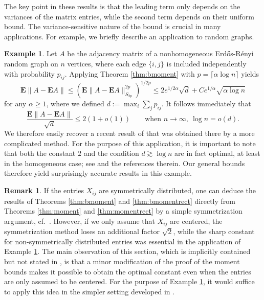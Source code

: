 \documentclass[10pt,reqno]{amsart}
\theoremstyle{definition}
\newtheorem{example}[thm]{Example}
\newtheorem{rem}[thm]{Remark}
\numberwithin{equation}{section}
\numberwithin{figure}{section}
\numberwithin{table}{section}
\begin{document}
The key point in these results is that the leading term only depends on 
the variances of the matrix entries, while the second term depends on 
their uniform bound. The variance-sensitive nature of the bound is crucial 
in many applications. For example, we briefly describe an application to 
random graphs.

\begin{example}
\label{ex:erdos}
Let $A$ be the adjacency matrix of a nonhomogeneous Erd\H{o}s-R\'enyi 
random graph on $n$ vertices, where each edge $\{i,j\}$ is included 
independently with probability $p_{ij}$. Applying Theorem 
\ref{thm:bmoment} with $p=\lceil \alpha\log n\rceil$ yields
$$
	\mathbf{E}\|A-\mathbf{E}A\| \le
	(\mathbf{E}\|A-\mathbf{E}A\|_{S_{2p}}^{2p})^{1/2p} 
	\le
	2e^{1/2\alpha}\sqrt{d}+Ce^{1/\alpha}\sqrt{\alpha\log n}
$$
for any $\alpha\ge 1$, where we defined
$d:=\max_i\sum_j p_{ij}$. It follows immediately that
$$
	\frac{\mathbf{E}\|A-\mathbf{E}A\|}{\sqrt{d}} \le
	2(1+o(1))
	\qquad\mbox{when }n\to\infty,~\log n=o(d).
$$
We therefore easily recover a recent result of \cite{BBK17} that was 
obtained there by a more complicated method. For the purpose of this 
application, it is important to note that both the constant $2$ and the 
condition $d\gtrsim\log n$ are in fact optimal, at least in the 
homogeneous case; see \cite{BBK17} and the references therein. Our general 
bounds therefore yield surprisingly accurate results in this example.
\end{example}

\begin{rem}
If the entries $X_{ij}$ are symmetrically distributed, one can deduce the 
results of Theorems \ref{thm:bmoment} and \ref{thm:bmomentrect} directly 
from Theorems \ref{thm:moment} and \ref{thm:momentrect} by a simple 
symmetrization argument, cf.\ \cite[Corollary 
3.6]{BvH16}. However, if we only assume that $X_{ij}$ are centered, the
symmetrization method loses an additional factor $\sqrt{2}$, while the 
sharp constant for non-symmetrically distributed entries was essential
in the application of Example \ref{ex:erdos}. The main 
observation of this section, which is implicitly contained but not stated 
in \cite{BvH16}, is that a minor modification of the proof of the 
moment bounds makes it possible to obtain the optimal constant even when 
the entries are only assumed to be  
centered. For the purpose of Example \ref{ex:erdos}, it would suffice 
to apply this idea in the simpler setting developed in \cite{BvH16}. 
\end{rem}
\end{document}
